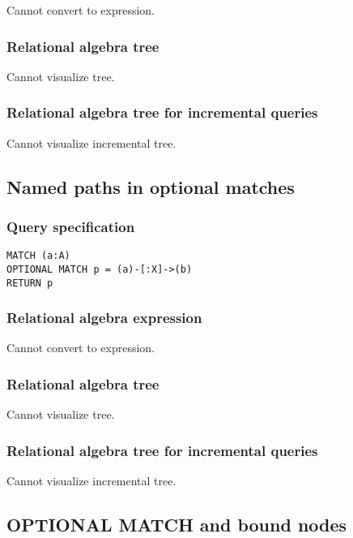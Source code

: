 Cannot convert to expression.

\subsubsection*{Relational algebra tree}

Cannot visualize tree.

\subsubsection*{Relational algebra tree for incremental queries}

Cannot visualize incremental tree.

\subsection{Named paths in optional matches}

\subsubsection*{Query specification}

\begin{lstlisting}
MATCH (a:A)
OPTIONAL MATCH p = (a)-[:X]->(b)
RETURN p
\end{lstlisting}

\subsubsection*{Relational algebra expression}

Cannot convert to expression.

\subsubsection*{Relational algebra tree}

Cannot visualize tree.

\subsubsection*{Relational algebra tree for incremental queries}

Cannot visualize incremental tree.

\subsection{OPTIONAL MATCH and bound nodes}

